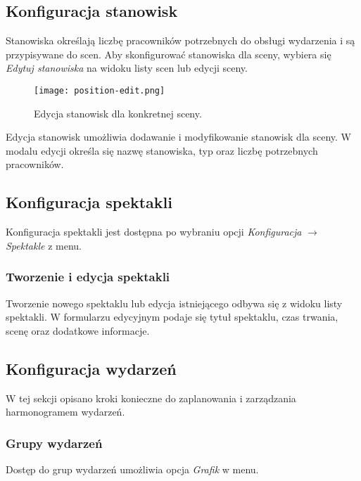 \documentclass[shortabstract]{iithesis}
\begin{document}
\subsection{Konfiguracja stanowisk}

Stanowiska określają liczbę pracowników potrzebnych do obsługi wydarzenia i są przypisywane do scen. Aby skonfigurować stanowiska dla sceny, wybiera się \textit{Edytuj stanowiska} na widoku listy scen lub edycji sceny.

\begin{figure}[h]
    \centering
    \texttt{[image: position-edit.png]}
    \caption{Edycja stanowisk dla konkretnej sceny.}
    \label{fig:position-edit}
\end{figure}

Edycja stanowisk umożliwia dodawanie i modyfikowanie stanowisk dla sceny. W modalu edycji określa się nazwę stanowiska, typ oraz liczbę potrzebnych pracowników.


\subsection{Konfiguracja spektakli}
\label{show-edit}

Konfiguracja spektakli jest dostępna po wybraniu opcji \textit{Konfiguracja} $\rightarrow$ \textit{Spektakle} z menu.

\subsubsection{Tworzenie i edycja spektakli}

Tworzenie nowego spektaklu lub edycja istniejącego odbywa się z widoku listy spektakli. W formularzu edycyjnym podaje się tytuł spektaklu, czas trwania, scenę oraz dodatkowe informacje.

\newpage

\subsection{Konfiguracja wydarzeń}

W tej sekcji opisano kroki konieczne do zaplanowania i zarządzania harmonogramem wydarzeń.

\subsubsection{Grupy wydarzeń}
Dostęp do grup wydarzeń umożliwia opcja \textit{Grafik} w menu.
\end{document}
